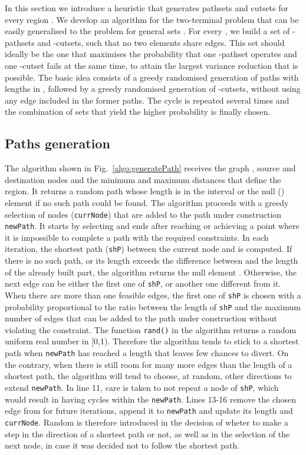 \documentclass[a4paper]{article}
\begin{document}
In this section we introduce a heuristic that generates pathsets and cutsets for every region . We develop an algorithm for the two-terminal problem that can be easily generalised to the problem for general sets . For every , we build a set of -pathsets and -cutsets, such that no two elements share edges. This set should ideally be the one that maximises the probability  that one -pathset operates and one -cutset fails at the same time, to attain the largest variance reduction that is possible. The basic idea consists of a greedy randomised generation of paths with lengths in , followed by a greedy randomised generation of -cutsets, without using any edge included in the former paths. The cycle is repeated several times and the combination of sets that yield the higher probability is finally chosen.

\subsection{Paths generation}

The algorithm shown in Fig.~\ref{algo:generatePath} receives the graph , source and destination nodes  and the minimum and maximum distances  that define the region. It returns a random path whose length is in the interval  or the null () element if no such path could be found. The algorithm proceeds with a greedy selection of nodes ({\tt currNode}) that are added to the path under construction {\tt newPath}. It starts by selecting  and ends after reaching  or achieving a point where it is impossible to complete a path with the required constraints. In each iteration, the shortest path ({\tt shP}) between the current node and  is computed. If there is no such path, or its length exceeds the difference between  and the length of the already built part, the algorithm returns the null element . Otherwise, the next edge can be either the first one of {\tt shP}, or another one different from it. When there are more than one feasible edges, the first one of {\tt shP} is chosen with a probability proportional to the ratio between the length of {\tt shP} and the maximum number of edges that can be added to the path under construction without violating the  constraint. The function {\tt rand()} in the algorithm returns a random uniform real number in [0,1). Therefore the algorithm tends to stick to a shortest path when {\tt newPath} has reached a length that leaves few chances to divert. On the contrary, when there is still room for many more edges than the length of a shortest path, the algorithm will tend to choose, at random, other directions to extend {\tt newPath}. In line 11, care is taken to not repeat a node of {\tt shP}, which would result in having cycles within the {\tt newPath}. Lines 13-16 remove the chosen edge from  for future iterations, append it to {\tt newPath} and update its length  and {\tt currNode}. Random is therefore introduced in the decision of wheter to make a step in the direction of a shortest path or not, as well as in the selection of the next node, in case it was decided not to follow the shortest path.
\end{document}
